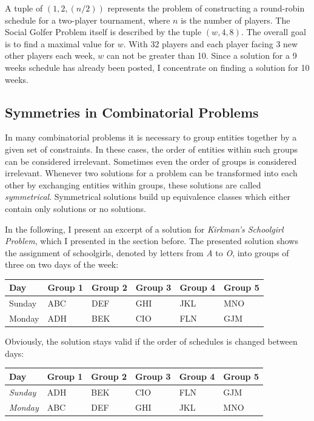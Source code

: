 \documentclass[a4paper]{scrartcl}
\begin{document}
A tuple of $(1,2,(n/2))$ represents the problem of constructing a round-robin schedule for a two-player tournament, where $n$ is the number of players. The Social Golfer Problem itself is described by the tuple $(w,4,8)$. The overall goal is to find a maximal value for $w$. With 32 players and each player facing 3 new other players each week, $w$ can not be greater than 10. Since a solution for a 9 weeks schedule has already been posted, I concentrate on finding a solution for 10 weeks.

\subsection{Symmetries in Combinatorial Problems}

In many combinatorial problems it is necessary to group entities together by a given set of constraints. In these cases, the order of entities within such groups can be considered irrelevant. Sometimes even the order of groups is considered irrelevant. Whenever two solutions for a problem can be transformed into each other by exchanging entities within groups, these solutions are called \emph{symmetrical}. Symmetrical solutions build up equivalence classes which either contain only solutions or no solutions\cite{Smith01}.

In the following, I present an excerpt of a solution for \emph{Kirkman's Schoolgirl Problem}, which I presented in the section before. The presented solution shows the assignment of schoolgirls, denoted by letters from \emph{A} to \emph{O}, into groups of three on two days of the week:

\begin{table}[h]
\centering
\begin{tabular}{ l | l  l  l l  l }
Day & Group 1 & Group 2 & Group 3 & Group 4 & Group 5 \\
\hline
Sunday & ABC & DEF & GHI & JKL & MNO \\
Monday & ADH  & BEK & CIO & FLN & GJM \\
\end{tabular}
\end{table}

Obviously, the solution stays valid if the order of schedules is changed between days:

\begin{table}[h]
\centering
\begin{tabular}{ l | l  l  l l  l }
Day & Group 1 & Group 2 & Group 3 & Group 4 & Group 5 \\
\hline
\emph{Sunday} & ADH  & BEK & CIO & FLN & GJM \\
\emph{Monday} & ABC & DEF & GHI & JKL & MNO \\
\end{tabular}
\end{table}
\end{document}
